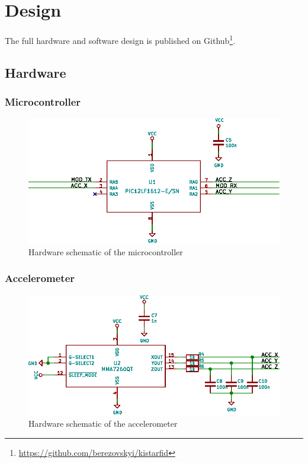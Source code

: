 \section{Design}

The full  hardware and software design is published on Github\footnote{\url{https://github.com/berezovskyi/kistarfid}}.

\subsection{Hardware}

\subsubsection{Microcontroller}
\begin{figure}[h!]
    \centering
    \includegraphics[scale=1.0]{res/schematic-pic.eps}
    \caption{Hardware schematic of the microcontroller}
    \label{fig:sch-pic}
\end{figure}

\subsubsection{Accelerometer}
\begin{figure}[h!]
    \centering
    \includegraphics[scale=1.0]{res/schematic-acc.eps}
    \caption{Hardware schematic of the accelerometer}
    \label{fig:sch-acc}
\end{figure}


